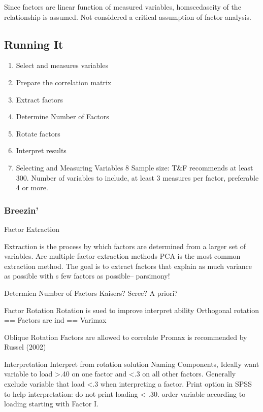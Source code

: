 \documentclass[]{book}
\providecommand{\tightlist}{%
  \setlength{\itemsep}{0pt}\setlength{\parskip}{0pt}}
\theoremstyle{definition}
\theoremstyle{definition}
\theoremstyle{definition}
\theoremstyle{remark}
\begin{document}
Since factors are linear function of measured variables, homscedascity
of the relationship is assumed. Not considered a critical assumption of
factor analysis.

\subsection{Running It}\label{running-it}

\begin{enumerate}
\def\labelenumi{\arabic{enumi}.}
\tightlist
\item
  Select and measures variables
\item
  Prepare the correlation matrix
\item
  Extract factors
\item
  Determine Number of Factors
\item
  Rotate factors
\item
  Interpret results
\item
  Selecting and Measuring Variables 8 Sample size: T\&F recommends at
  least 300. Number of variables to include, at least 3 measures per
  factor, preferable 4 or more.
\end{enumerate}

\subsubsection{Breezin'}\label{breezin}

Factor Extraction

Extraction is the process by which factors are determined from a larger
set of variables. Are multiple factor extraction methods PCA is the most
common extraction method. The goal is to extract factors that explain as
much variance as possible with s few factors as possible-- parsimony!

Determien Number of Factors Kaisers? Scree? A priori?

Factor Rotation Rotation is sued to improve interpret ability Orthogonal
rotation == Factors are ind == Varimax

Oblique Rotation Factors are allowed to correlate Promax is recommended
by Russel (2002)

Interpretation Interpret from rotation solution Naming Components,
Ideally want variable to load \textgreater{}.40 on one factor and
\textless{}.3 on all other factors. Generally exclude variable that load
\textless{}.3 when interpreting a factor. Print option in SPSS to help
interpretation: do not print loading \textless{} .30. order variable
according to loading starting with Factor I.
\end{document}
